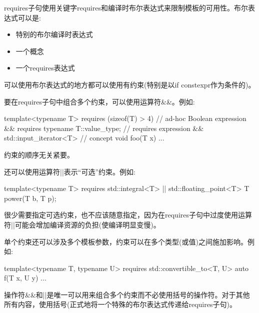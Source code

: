requires子句使用关键字requires和编译时布尔表达式来限制模板的可用性。布尔表达式可以是:

\begin{itemize}
\item
特别的布尔编译时表达式

\item
一个概念

\item
一个requires表达式
\end{itemize}

可以使用布尔表达式的地方都可以使用有约束(特别是以if constexpr作为条件的)。


要在requires子句中组合多个约束，可以使用运算符\&\&。例如:

\begin{cpp}
template<typename T>
requires (sizeof(T) > 4) // ad-hoc Boolean expression
			&& requires { typename T::value_type; } // requires expression
			&& std::input_iterator<T> // concept
void foo(T x) {
	...
}
\end{cpp}

约束的顺序无关紧要。

还可以使用运算符||表示“可选”约束。例如:

\begin{cpp}
template<typename T>
requires std::integral<T> || std::floating_point<T>
T power(T b, T p);
\end{cpp}

很少需要指定可选约束，也不应该随意指定，因为在requires子句中过度使用运算符||可能会增加编译资源的负担(使编译明显变慢)。

单个约束还可以涉及多个模板参数，约束可以在多个类型(或值)之间施加影响。例如:

\begin{cpp}
template<typename T, typename U>
requires std::convertible_to<T, U>
auto f(T x, U y) {
	...
}
\end{cpp}

操作符\&\&和||是唯一可以用来组合多个约束而不必使用括号的操作符。对于其他所有内容，使用括号(正式地将一个特殊的布尔表达式传递给requires子句)。






























